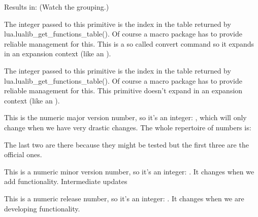 Results in: \inlinebuffer\space (Watch the grouping.)

\stopnewprimitive

\startnewprimitive[title={\prm {luafunction}}]

The integer passed to this primitive is the index in the table returned by \typ
{lua.lualib_get_functions_table()}. Of course a macro package has to provide
reliable management for this. This is a so called convert command so it expands
in an expansion context (like an ).

\stopnewprimitive

\startnewprimitive[title={\prm {luafunctioncall}}]

The integer passed to this primitive is the index in the table returned by \typ
{lua.lualib_get_functions_table()}. Of course a macro package has to provide
reliable management for this. This primitive doesn't expand in an expansion
context (like an ).

\stopnewprimitive

\startnewprimitive[title={\prm {luametatexmajorversion}}]

This is the numeric major version number, so it's an integer: \the
\luametatexmajorversion, which will only change when we have very drastic
changes. The whole repertoire of numbers is:

\starttabulate
\NC \type {\the\luametatexmajorversion} \NC \the\luametatexmajorversion \NC \NR
\NC \type {\the\luametatexminorversion} \NC \the\luametatexminorversion \NC \NR
\NC \type {\the\luametatexrelease}      \NC \the\luametatexrelease      \NC \NR
\NC \type {\the\luatexversion}          \NC \the\luatexversion          \NC \NR
\NC \type {\the\luatexrevision}         \NC \the\luatexrevision         \NC \NR
\stoptabulate

The last two are there because they might be tested but the first three are the
official ones.

\stopnewprimitive

\startnewprimitive[title={\prm {luametatexminorversion}}]

This is a numeric minor version number, so it's an integer: \the
\luametatexminorversion. It changes when we add functionality. Intermediate
updates

\stopnewprimitive

\startnewprimitive[title={\prm {luametatexrelease}}]

This is a numeric release number, so it's an integer: \the\luametatexrelease. It
changes when we are developing functionality.

